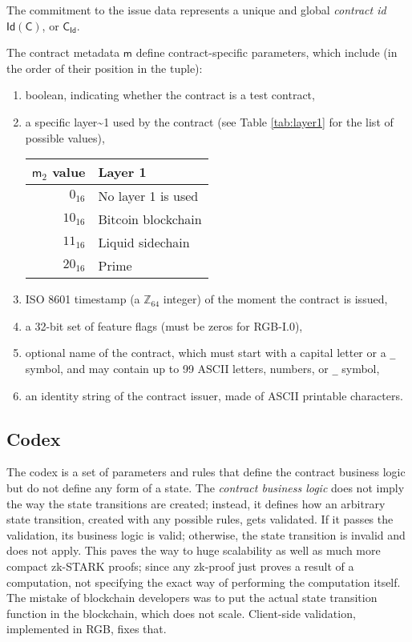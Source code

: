 \documentclass[9pt,oneside]{amsart}
\newenvironment{coltable}
  {\par\bigskip\noindent\minipage{\columnwidth}\centering}
  {\endminipage\par\bigskip}
\begin{document}
\newpage
\begin{multicols}{2}

The commitment to the \gls{issue} data represents a unique and global \emph{contract id}
$\mathsf{Id}(\mathsf{C})$, or $\mathsf{C_{Id}}$.

The contract metadata $\mathsf{m}$ define contract-specific parameters, which include
(in the order of their position in the tuple):

\begin{enumerate}
\item boolean, indicating whether the contract is a test contract,
\item a specific \gls{layer~1} used by the contract
  (see Table \ref{tab:layer1} for the list of possible values),

\begin{coltable}
\label{tab:layer1}
\begin{tabular}{r l}
\toprule
$\mathsf{m}_2$ value & Layer 1 \\
\midrule
$0_{16}$ & No layer 1 is used \\
$10_{16}$ & Bitcoin blockchain \cite{Bitcoin} \\
$11_{16}$ & Liquid sidechain \cite{Liquid} \\
$20_{16}$ & Prime \cite{Prime} \\
\bottomrule
\end{tabular}
\end{coltable}

\item ISO 8601 timestamp (a $\mathbb{Z}_{64}$ integer) of the moment the contract is issued,
\item a 32-bit set of feature flags (must be zeros for RGB-I.0),
\item optional name of the contract, which must start with a capital letter or a \texttt{\_} symbol,
  and may contain up to 99 ASCII letters, numbers, or \texttt{\_} symbol,
\item an identity string of the contract issuer, made of ASCII printable characters.
\end{enumerate}

\subsection{Codex}\label{Codex}

The codex is a set of parameters and rules that define the contract business logic
but do not define any form of a state. The \emph{contract business logic} does not imply
the way the state transitions are created; instead, it defines how an arbitrary
state transition, created with any possible rules, gets validated. If it passes the validation,
its business logic is valid; otherwise, the state transition is invalid and does not apply.
This paves the way to huge scalability as well as much more compact zk-STARK proofs;
since any zk-proof just proves a result of a computation,
not specifying the exact way of performing the computation itself.
The mistake of blockchain developers was to put the actual state transition function in
the blockchain, which does not scale. Client-side validation, implemented in RGB, fixes that.


\end{multicols}
\end{document}
